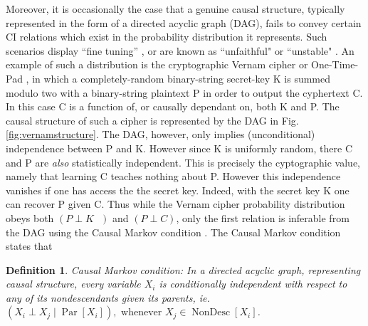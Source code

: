 \documentclass[preliminary,copyright,creativecommons,american]{eptcs}%
\theoremstyle{lemeq}
\newtheorem{defin}{Definition}
\newcommand{\fig}[1]{Fig.\,\ref{#1}}
\begin{document}
Moreover, it is occasionally the case that a genuine causal structure, typically represented in the form of a directed acyclic graph (DAG), fails to convey certain CI relations which exist in the probability distribution  it represents. Such scenarios display ``fine tuning'' \cite{spekkens2012causal}, or are known as ``unfaithful" \cite{spirtes2011causation} or ``unstable" \cite{pearl2009causality}. An example of such a distribution is the cryptographic Vernam cipher or One-Time-Pad \cite{vernam1926cipher,singh2000code,safavi2008onetimepad}, in which a completely-random binary-string secret-key K is summed modulo two with a binary-string plaintext P in order to output the cyphertext C. In this case C is a function of, or causally dependant on, both K and P. The causal structure of such a cipher is represented by the DAG in \fig{fig:vernamstructure}. The DAG, however, only implies (unconditional) independence between P and K. However since K is uniformly random, there C and P are \emph{also} statistically independent. This is precisely the cyptographic value, namely that learning C teaches nothing about P. However this independence vanishes if one has access the the secret key. Indeed, with the secret key K one can recover P given C. Thus while the Vernam cipher probability distribution obeys both $(P\perp K\text{ })$ and $(P\perp C)$, only the first relation is inferable from the DAG using the Causal Markov condition \cite{pearl2009causality,spekkens2012causal}. The Causal Markov condition states that 
\begin{defin}
Causal Markov condition: In a directed acyclic graph, representing causal structure, every variable $X_i$ is conditionally independent with respect to any of its nondescendants given its parents, ie. $\left(X_i \perp X_j \mid \operatorname{Par}[X_i]\right), \text{ whenever }X_j\in\operatorname{NonDesc}[X_i]$.
\end{defin}
 




\nocite{*}


\end{document}

